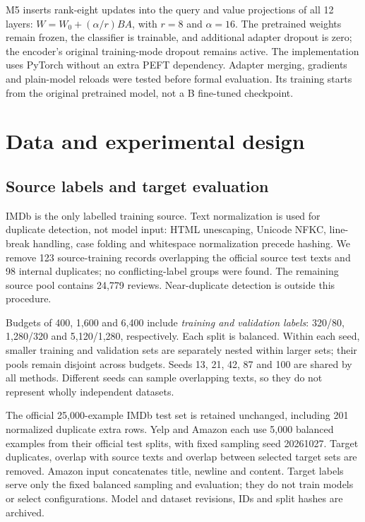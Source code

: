 \documentclass[a4paper,10pt]{article}
\begin{document}
M5 inserts rank-eight updates into the query and value projections of all 12 layers: $W=W_0+(\alpha/r)BA$, with $r=8$ and $\alpha=16$. The pretrained weights remain frozen, the classifier is trainable, and additional adapter dropout is zero; the encoder's original training-mode dropout remains active. The implementation uses PyTorch without an extra PEFT dependency. Adapter merging, gradients and plain-model reloads were tested before formal evaluation. Its training starts from the original pretrained model, not a B fine-tuned checkpoint.

\clearpage
\section{Data and experimental design}
\subsection{Source labels and target evaluation}
IMDb is the only labelled training source. Text normalization is used for duplicate detection, not model input: HTML unescaping, Unicode NFKC, line-break handling, case folding and whitespace normalization precede hashing. We remove 123 source-training records overlapping the official source test texts and 98 internal duplicates; no conflicting-label groups were found. The remaining source pool contains 24,779 reviews. Near-duplicate detection is outside this procedure.

Budgets of 400, 1,600 and 6,400 include \emph{training and validation labels}: 320/80, 1,280/320 and 5,120/1,280, respectively. Each split is balanced. Within each seed, smaller training and validation sets are separately nested within larger sets; their pools remain disjoint across budgets. Seeds 13, 21, 42, 87 and 100 are shared by all methods. Different seeds can sample overlapping texts, so they do not represent wholly independent datasets.

\begin{center}

\label{tab:data}
\end{center}
The official 25,000-example IMDb test set is retained unchanged, including 201 normalized duplicate extra rows. Yelp and Amazon each use 5,000 balanced examples from their official test splits, with fixed sampling seed 20261027. Target duplicates, overlap with source texts and overlap between selected target sets are removed. Amazon input concatenates title, newline and content. Target labels serve only the fixed balanced sampling and evaluation; they do not train models or select configurations. Model and dataset revisions, IDs and split hashes are archived.
\end{document}
